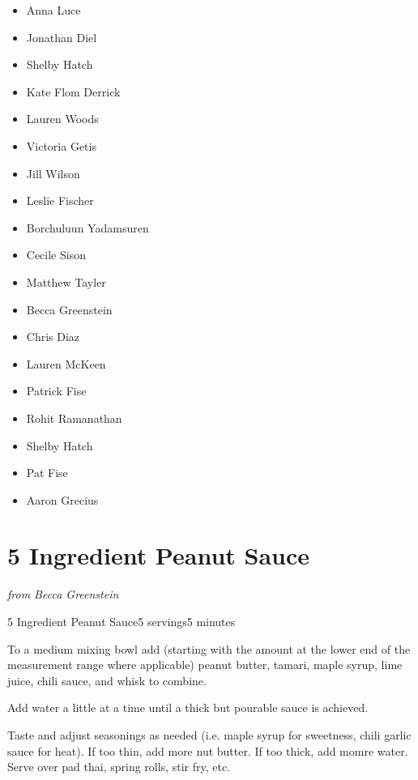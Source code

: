 \documentclass[openany]{book}
\providecommand{\tightlist}{%
  \setlength{\itemsep}{0pt}\setlength{\parskip}{0pt}}
\begin{document}
\begin{itemize}
\tightlist
\item
  Anna Luce
\item
  Jonathan Diel
\item
  Shelby Hatch
\item
  Kate Flom Derrick
\item
  Lauren Woods
\item
  Victoria Getis
\item
  Jill Wilson
\item
  Leslie Fischer
\item
  Borchuluun Yadamsuren
\item
  Cecile Sison
\item
  Matthew Tayler
\item
  Becca Greenstein
\item
  Chris Diaz
\item
  Lauren McKeen
\item
  Patrick Fise
\item
  Rohit Ramanathan
\item
  Shelby Hatch
\item
  Pat Fise
\item
  Aaron Grecius
\end{itemize}

\chapter{5 Ingredient Peanut Sauce}\label{ingredient-peanut-sauce}

\emph{from Becca Greenstein}

\begin{recipe}{5 Ingredient Peanut Sauce}{5 servings}{5 minutes}

To a medium mixing bowl add (starting with the amount at the lower end of the measurement range where applicable) peanut butter, tamari, maple syrup, lime juice, chili sauce, and whisk to combine.


Add water a little at a time until a thick but pourable sauce is achieved.

\newstep Taste and adjust seasonings as needed (i.e. maple syrup for sweetness, chili garlic sauce for heat). If too thin, add more nut butter. If too thick, add momre water.
\newstep Serve over pad thai, spring rolls, stir fry, etc.

\end{recipe}
\end{document}
